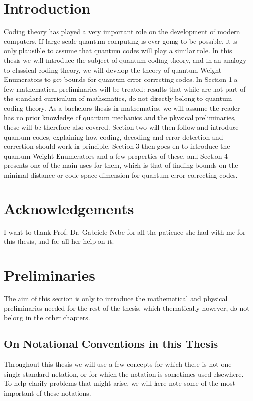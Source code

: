 \documentclass[12pt,a4paper,BCOR15mm,twoside,DIV12]{article}
\theoremstyle{definition}
\begin{document}
\section*{Introduction}
Coding theory has played a very important role on the development of modern computers. If large-scale quantum computing is ever going to be possible, it is only plausible to assume that quantum codes will play a similar role. 
In this thesis we will introduce the subject of quantum coding theory, and in an analogy to classical coding theory, we will develop the theory of quantum Weight Enumerators to get bounds for quantum error correcting codes. In Section 1 a few mathematical
preliminaries will be treated: results that while are not part of the standard curriculum of mathematics, do not directly belong to quantum coding theory. As a bachelors thesis in mathematics, we will assume the reader has
 no prior knowledge of quantum mechanics and the physical preliminaries, these will be therefore also covered. Section two will then follow and introduce quantum codes, explaining how coding, decoding and error detection and
 correction should work in principle. Section 3 then goes on to introduce the quantum Weight Enumerators and a few properties of these, and Section 4 presents one of the main uses for them, which is that of finding bounds on the minimal
distance or code space dimension for quantum error correcting codes. 

\section*{Acknowledgements}
I want to thank Prof. Dr. Gabriele Nebe for all the patience she had with me for this thesis, and for all her help on it. 
\clearpage \newpage

\section{Preliminaries}
The aim of this section is only to introduce the mathematical and physical preliminaries needed for the rest of the thesis, which thematically however, do not belong in the other chapters.
\subsection{On Notational Conventions in this Thesis}\label{firstnotations}

Throughout this thesis we will use a few concepts for which there is not one single standard notation, or for which the notation is sometimes used elsewhere. To help clarify problems that might arise, 
we will here note some of the most important of these notations. \\
\end{document}
